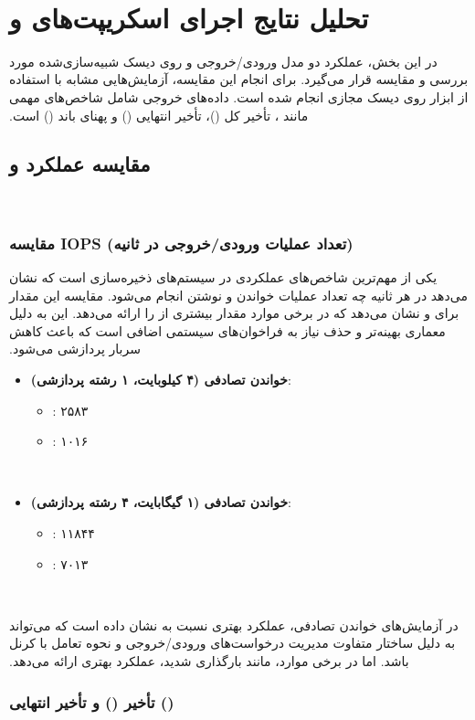 ‫
‫\section*{تحلیل نتایج اجرای اسکریپت‌های  و }
‫
‫در این بخش، عملکرد دو مدل ورودی/خروجی  و  روی دیسک شبیه‌سازی‌شده  مورد بررسی و مقایسه قرار می‌گیرد. برای انجام این مقایسه، آزمایش‌هایی مشابه با استفاده از ابزار  روی دیسک مجازی انجام شده است. داده‌های خروجی شامل شاخص‌های مهمی مانند ، تأخیر کل ()، تأخیر انتهایی () و پهنای باند () است.
‫
‫\subsection*{مقایسه عملکرد  و }
‫
‫\subsubsection*{مقایسه IOPS (تعداد عملیات ورودی/خروجی در ثانیه)}
‫
‫ یکی از مهم‌ترین شاخص‌های عملکردی در سیستم‌های ذخیره‌سازی است که نشان می‌دهد در هر ثانیه چه تعداد عملیات خواندن و نوشتن انجام می‌شود. مقایسه این مقدار برای  و  نشان می‌دهد که  در برخی موارد مقدار بیشتری از  را ارائه می‌دهد. این به دلیل معماری بهینه‌تر  و حذف نیاز به فراخوان‌های سیستمی اضافی است که باعث کاهش سربار پردازشی می‌شود.
‫
‫\begin{itemize}
‫	\item \textbf{خواندن تصادفی (۴ کیلوبایت، ۱ رشته پردازشی)}:
‫	\begin{itemize}
‫		\item {}: ۲۵۸۳ 
‫		\item {}: ۱۰۱۶ 
‫	\end{itemize}
‫	\item \textbf{خواندن تصادفی (۱ گیگابایت، ۴ رشته پردازشی)}:
‫	\begin{itemize}
‫		\item {}: ۱۱۸۴۴ 
‫		\item {}: ۷۰۱۳ 
‫	\end{itemize}
‫\end{itemize}
‫
‫در آزمایش‌های خواندن تصادفی،  عملکرد بهتری نسبت به  نشان داده است که می‌تواند به دلیل ساختار متفاوت مدیریت درخواست‌های ورودی/خروجی و نحوه تعامل با کرنل باشد. اما در برخی موارد، مانند بارگذاری شدید،  عملکرد بهتری ارائه می‌دهد.
‫
‫\subsubsection*{تأخیر () و تأخیر انتهایی ()}
